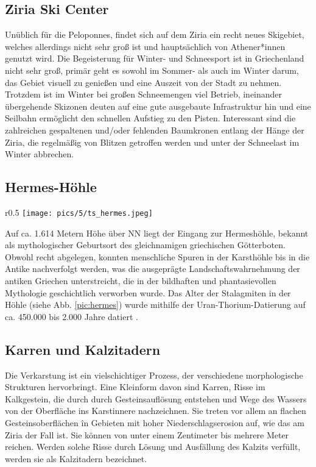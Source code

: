 \documentclass[preprint]{geomorphica} %
\begin{document}
\subsection{Ziria Ski Center}

Unüblich für die Peloponnes, findet sich auf dem Ziria ein recht neues Skigebiet, welches allerdings nicht sehr groß ist und hauptsächlich von Athener*innen genutzt wird. Die Begeisterung für Winter- und Schneesport ist in Griechenland nicht sehr groß, primär geht es sowohl im Sommer- als auch im Winter darum, das Gebiet visuell zu genießen und eine Auszeit von der Stadt zu nehmen. Trotzdem ist im Winter bei großen Schneemengen viel Betrieb, ineinander übergehende Skizonen deuten auf eine gute ausgebaute Infrastruktur hin und eine Seilbahn ermöglicht den schnellen Aufstieg zu den Pisten. Interessant sind die zahlreichen gespaltenen und/oder fehlenden Baumkronen entlang der Hänge der Ziria, die regelmäßig von Blitzen getroffen werden und unter der Schneelast im Winter abbrechen.

\subsection{Hermes-Höhle}

\begin{wrapfigure}{r}{0.5\textwidth}
    \centering
    \texttt{[image: pics/5/ts\_hermes.jpeg]}
    \caption{Hermes-Höhle [Foto: Tabea Storch].}
    \label{pic:hermes}
\end{wrapfigure}

Auf ca. 1.614 Metern Höhe über NN liegt der Eingang zur Hermeshöhle, bekannt als mythologischer Geburtsort des gleichnamigen griechischen Götterboten. Obwohl recht abgelegen, konnten menschliche Spuren in der Karsthöhle bis in die Antike nachverfolgt werden, was die ausgeprägte Landschaftswahrnehmung der antiken Griechen unterstreicht, die in der bildhaften und phantasievollen Mythologie geschichtlich verworben wurde. Das Alter der Stalagmiten in der Höhle (siehe Abb. \ref{pic:hermes}) wurde mithilfe der Uran-Thorium-Datierung auf ca. 450.000 bis 2.000 Jahre datiert \cite{unkelHydraHermesHerkules2020}.

\subsection{Karren und Kalzitadern}

Die Verkarstung ist ein vielschichtiger Prozess, der verschiedene morphologische Strukturen hervorbringt. Eine Kleinform davon sind Karren, Risse im Kalkgestein, die durch durch Gesteinsauflösung entstehen und Wege des Wassers von der Oberfläche ins Karstinnere nachzeichnen. Sie treten vor allem an flachen Gesteinsoberflächen în Gebieten mit hoher Niederschlagserosion auf, wie das am Ziria der Fall ist. Sie können von unter einem Zentimeter bis mehrere Meter reichen. Werden solche Risse durch Lösung und Ausfällung des Kalzits verfüllt, werden sie als Kalzitadern bezeichnet.
\end{document}
